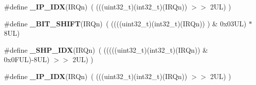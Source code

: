 \begin{DoxyCompactItemize}
\item 
\#define {\bfseries \+\_\+\+I\+P\+\_\+\+I\+DX}(I\+R\+Qn)~(   (((uint32\+\_\+t)(int32\+\_\+t)(I\+R\+Qn))                $>$$>$    2\+U\+L)      )\hypertarget{group___c_m_s_i_s___core___n_v_i_c_functions_ga370ec4b1751a6a889d849747df3763a9}{}\label{group___c_m_s_i_s___core___n_v_i_c_functions_ga370ec4b1751a6a889d849747df3763a9}

\item 
\#define {\bfseries \+\_\+\+B\+I\+T\+\_\+\+S\+H\+I\+FT}(I\+R\+Qn)~(  ((((uint32\+\_\+t)(int32\+\_\+t)(I\+R\+Qn))         )      \&  0x03\+U\+L) $\ast$ 8\+U\+L)\hypertarget{group___c_m_s_i_s___core___n_v_i_c_functions_ga53c75b28823441c6153269f0ecbed878}{}\label{group___c_m_s_i_s___core___n_v_i_c_functions_ga53c75b28823441c6153269f0ecbed878}

\item 
\#define {\bfseries \+\_\+\+S\+H\+P\+\_\+\+I\+DX}(I\+R\+Qn)~( (((((uint32\+\_\+t)(int32\+\_\+t)(I\+R\+Qn)) \& 0x0\+F\+U\+L)-\/8\+U\+L) $>$$>$    2\+U\+L)      )\hypertarget{group___c_m_s_i_s___core___n_v_i_c_functions_gaee4f7eb5d7e770ad51489dbceabb1755}{}\label{group___c_m_s_i_s___core___n_v_i_c_functions_gaee4f7eb5d7e770ad51489dbceabb1755}

\item 
\#define {\bfseries \+\_\+\+I\+P\+\_\+\+I\+DX}(I\+R\+Qn)~(   (((uint32\+\_\+t)(int32\+\_\+t)(I\+R\+Qn))                $>$$>$    2\+U\+L)      )\hypertarget{group___c_m_s_i_s___core___n_v_i_c_functions_ga370ec4b1751a6a889d849747df3763a9}{}\label{group___c_m_s_i_s___core___n_v_i_c_functions_ga370ec4b1751a6a889d849747df3763a9}

\end{DoxyCompactItemize}
